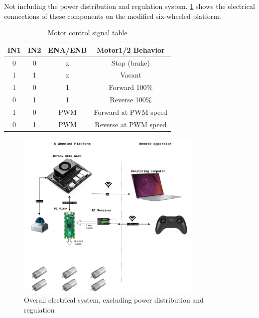 \documentclass[11pt]{article}
\begin{document}
            Not including the power distribution and regulation system, \ref{fig:overall_electical_system} shows the electrical connections of these components on the modified six-wheeled platform.


            \begin{table}[h!]
                \centering
                \begin{tabular}{|c|c|c|c|}
                \hline
                IN1 & IN2 & ENA/ENB & Motor1/2 Behavior \\ \hline
                0   & 0   & x       & Stop (brake)      \\ \hline
                1   & 1   & x       & Vacant            \\ \hline
                1   & 0   & 1       & Forward 100\%     \\ \hline
                0   & 1   & 1       & Reverse 100\%     \\ \hline
                1   & 0   & PWM     & Forward at PWM speed \\ \hline
                0   & 1   & PWM     & Reverse at PWM speed \\ \hline
                \end{tabular}
                \caption{Motor control signal table}
                \label{tab:motor_control}
            \end{table}

            \begin{figure}[H]
                \centering
                
                \includegraphics[width=0.8\textwidth]{Images/PFE-Page-2.drawio.png}
                \caption{Overall electrical system, excluding power distribution and regulation}
                \label{fig:overall_electical_system}
            \end{figure}
\end{document}
